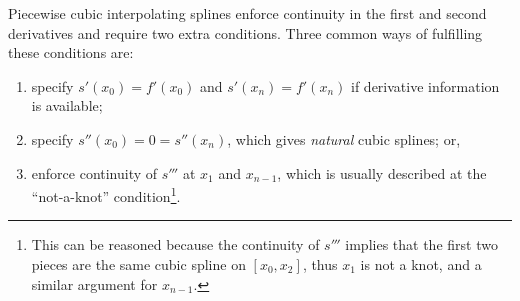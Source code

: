 \begin{example}
Piecewise cubic interpolating splines enforce continuity in the first and second derivatives and require two extra conditions. Three common ways of fulfilling these conditions are:
\begin{enumerate}
\item specify $s'(x_0)=f'(x_0)$ and $s'(x_n) = f'(x_n)$ if derivative information is available;
\item specify $s''(x_0) = 0 = s''(x_n)$, which gives {\em natural} cubic splines; or,
\item enforce continuity of $s'''$ at $x_1$ and $x_{n-1}$, which is usually described at the ``not-a-knot'' condition\footnote{This can be reasoned because the continuity of $s'''$ implies that the first two pieces are the same cubic spline on $[x_0,x_2]$, thus $x_1$ is not a knot, and a similar argument for $x_{n-1}$.}.
\end{enumerate}
\end{example}

